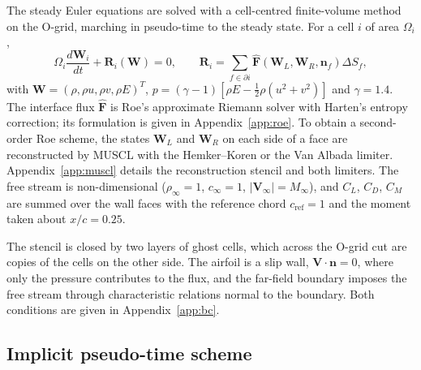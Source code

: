 \documentclass[12pt,a4paper]{article}
\begin{document}
The steady Euler equations are solved with a cell-centred finite-volume method on the O-grid,
marching in pseudo-time to the steady state. For a cell $i$ of area $\Omega_i$,
\begin{equation}
  \Omega_i\frac{d\mathbf{W}_i}{dt} + \mathbf{R}_i(\mathbf{W}) = 0,
  \qquad
  \mathbf{R}_i = \sum_{f\in\partial i}\widehat{\mathbf{F}}\!\left(\mathbf{W}_L,\mathbf{W}_R,\mathbf{n}_f\right)\Delta S_f,
  \label{eq:fv}
\end{equation}
with $\mathbf{W}=(\rho,\rho u,\rho v,\rho E)^T$, $p=(\gamma-1)\left[\rho E-\tfrac12\rho(u^2+v^2)\right]$
and $\gamma=1.4$. The interface flux $\widehat{\mathbf{F}}$ is Roe's approximate Riemann
solver with Harten's entropy correction; its formulation is given in
Appendix~\ref{app:roe}. To obtain a second-order Roe scheme, the states $\mathbf{W}_L$ and
$\mathbf{W}_R$ on each side of a face are reconstructed by MUSCL with the
Hemker--Koren or the Van Albada limiter. Appendix~\ref{app:muscl} details the reconstruction
stencil and both limiters. The free stream is non-dimensional ($\rho_\infty=1$, $c_\infty=1$,
$|\mathbf{V}_\infty|=M_\infty$), and $C_L$, $C_D$, $C_M$ are summed over the wall faces with the
reference chord $c_{\mathrm{ref}}=1$ and the moment taken about $x/c=0.25$.

The stencil is closed by two layers of ghost cells, which across the O-grid cut are copies of
the cells on the other side. The airfoil is a slip wall, $\mathbf{V}\cdot\mathbf{n}=0$, where
only the pressure contributes to the flux, and the far-field boundary imposes the free stream
through characteristic relations normal to the boundary. Both conditions are given in
Appendix~\ref{app:bc}.

\subsection{Implicit pseudo-time scheme}\label{sec:implicit}
\end{document}
